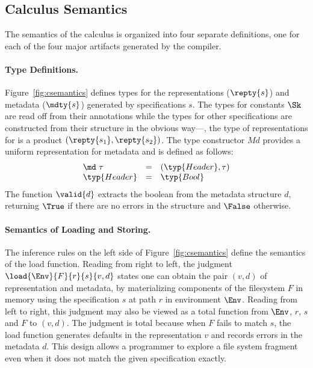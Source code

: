 \subsection{Calculus Semantics}
%
The semantics of the calculus is organized into four separate
definitions, one for each of the four major artifacts generated by the
\forest{} compiler.

\paragraph*{Type Definitions.}
Figure~\ref{fig:csemantics} defines types for the representations
($\repty{s}$) and metadata ($\mdty{s}$) generated by specifications
$s$. The types for constants $\Sk$ are read off from their annotations
while the types for other specifications are constructed from their
structure in the obvious way---\eg, the type of representations for
 is a product $(\repty{s_1}, \repty{s_2})$. The
type constructor $\mathit{Md}$ provides a uniform representation for
metadata and is defined as follows:
\[
\begin{array}{lcl}
\md~{\tau} & = & (\typ{Header}, \tau) \\
\typ{Header} & = & \typ{Bool} 
\end{array}
\]
The function $\valid{d}$ extracts the boolean from the metadata
structure $d$, returning $\True$ if there are no errors in the
structure and $\False$ otherwise. 

\paragraph*{Semantics of Loading and Storing.}
The inference rules on the left side of
Figure~\ref{fig:csemantics} define the semantics of the load
function. Reading from right to left, the judgment 
$\load{\Env}{F}{r}{s}{v,d}$ states one can obtain the pair $(v,d)$ of
representation and metadata, by materializing components
of the filesystem $F$ in memory using the specification $s$
at path $r$ in environment $\Env$.  Reading from
left to right, this judgment may also be viewed
as a total function from $\Env$, $r$, $s$ and $F$ to $(v,d)$. The
judgment is total because when $F$ fails to match $s$, the load
function generates defaults in the representation $v$ and records
errors in the metadata $d$.  This design allows a programmer to
explore a file system fragment even when it does not match the
given specification exactly.

